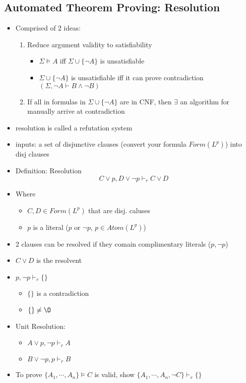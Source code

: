 \documentclass[11pt]{article}
\begin{document}
\subsection{Automated Theorem Proving: Resolution}
\begin{itemize}
    \item Comprised of 2 ideas: 
    \begin{enumerate}
        \item Reduce argument validity to satisfiability 
        \begin{itemize}
            \item $\Sigma\vDash A$ iff $\Sigma\cup\{\neg A\}$ is unsatisfiable
            \item $\Sigma\cup\{\neg A\}$ is unsatisfiable iff it can prove contradiction $(\Sigma, \neg A\vdash B\land\neg B)$
        \end{itemize}
        \item If all in formulas in $\Sigma\cup\{\neg A\}$ are in CNF, then $\exists$ an algorithm for manually arrive at contradiction 
    \end{enumerate}
    \item resolution is called a refutation system 
    \item inputs: a set of disjunctive clauses (convert your formula $Form(L^p)$) into disj clauses 
    \item Definition: Resolution \[C\lor p, D\lor\neg p \vdash_r C\lor D\]
    \item Where 
    \begin{itemize}
        \item $C, D\in Form(L^p)$ that are disj. caluses 
        \item $p$ is a literal ($p$ or $\neg p$, $p\in Atom(L^p)$)
    \end{itemize}
    \item 2 clauses can be resolved if they comain complimentary literals ($p, \neg p$)
    \item $C\lor D$ is the resolvent 
    \item $p, \neg p\vdash_r \{\}$
    \begin{itemize}
        \item $\{\}$ is a contradiction 
        \item $\{\}\neq\O$
    \end{itemize}
    \item Unit Resolution: 
    \begin{itemize}
        \item $A\lor p, \neg p\vdash_r A$
        \item $B\lor\neg p, p\vdash_r B$
    \end{itemize}
    \item To prove $\{A_1,\cdots, A_n\}\vDash C$ is valid, show $\{A_1,\cdots,A_n,\neg C\}\vdash_r \{\}$
\end{itemize}
\end{document}
